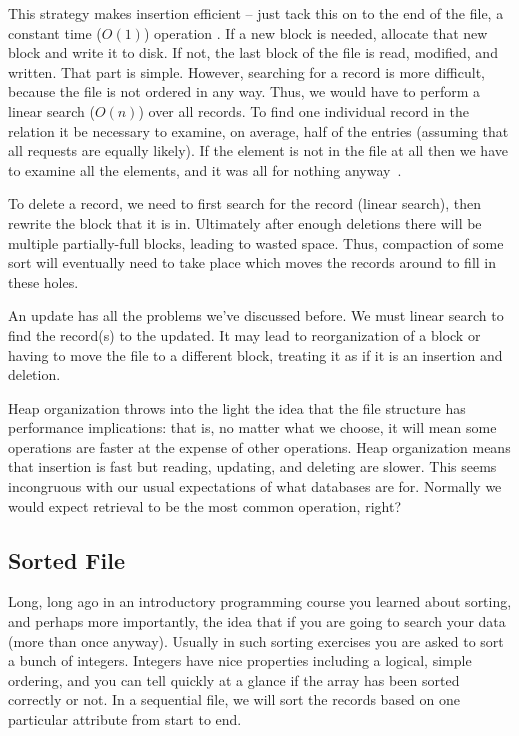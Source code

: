 This strategy makes insertion efficient -- just tack this on to the end of the file, a constant time ($O(1)$) operation . If a new block is needed, allocate that new block and write it to disk. If not, the last block of the file is read, modified, and written. That part is simple. However, searching for a record is more difficult, because the file is not ordered in any way. Thus, we would have to perform a linear search ($O(n)$) over all records. To find one individual record in the relation it be necessary to examine, on average, half of the entries (assuming that all requests are equally likely). If the element is not in the file at all then we have to examine all the elements, and it was all for nothing anyway~\cite{fds}. 

To delete a record, we need to first search for the record (linear search), then rewrite the block that it is in. Ultimately after enough deletions there will be multiple partially-full blocks, leading to wasted space. Thus, compaction of some sort will eventually need to take place which moves the records around to fill in these holes.

An update has all the problems we've discussed before. We must linear search to find the record(s) to the updated.  It may lead to reorganization of a block or having to move the file to a different block, treating it as if it is an insertion and deletion.  

Heap organization throws into the light the idea that the file structure has performance implications: that is, no matter what we choose, it will mean some operations are faster at the expense of other operations. Heap organization means that insertion is fast but reading, updating, and deleting are slower. This seems incongruous with our usual expectations of what databases are for. Normally we would expect retrieval to be the most common operation, right?

\subsection*{Sorted File}

Long, long ago in an introductory programming course you learned about sorting, and perhaps more importantly, the idea that if you are going to search your data (more than once anyway). Usually in such sorting exercises you are asked to sort a bunch of integers. Integers have nice properties including a logical, simple ordering, and you can tell quickly at a glance if the array has been sorted correctly or not. In a sequential file, we will sort the records based on one particular attribute from start to end.


